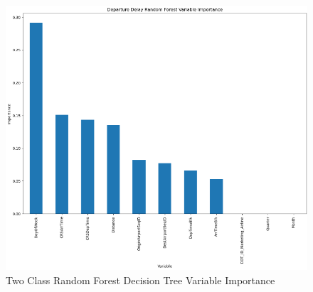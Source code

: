 \documentclass[a4paper,12pt]{article}
\begin{document}
\begin{figure}
    \centering
    \includegraphics*[scale=.50]{../../img/model_rq2_rf.png}
    \caption[]{Two Class Random Forest Decision Tree Variable Importance}
    \label{fig:model:rq2:rfc_1}
\end{figure}
\end{document}
